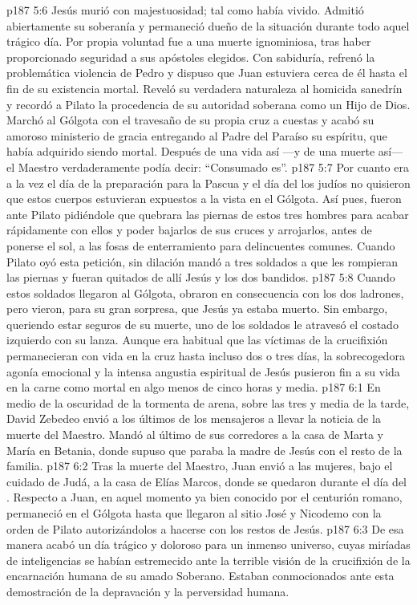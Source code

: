 \vs p187 5:6 \pc Jesús murió con majestuosidad; tal como había vivido. Admitió abiertamente su soberanía y permaneció dueño de la situación durante todo aquel trágico día. Por propia voluntad fue a una muerte ignominiosa, tras haber proporcionado seguridad a sus apóstoles elegidos. Con sabiduría, refrenó la problemática violencia de Pedro y dispuso que Juan estuviera cerca de él hasta el fin de su existencia mortal. Reveló su verdadera naturaleza al homicida sanedrín y recordó a Pilato la procedencia de su autoridad soberana como un Hijo de Dios. Marchó al Gólgota con el travesaño de su propia cruz a cuestas y acabó su amoroso ministerio de gracia entregando al Padre del Paraíso su espíritu, que había adquirido siendo mortal. Después de una vida así ---y de una muerte así--- el Maestro verdaderamente podía decir: “Consumado es”.
\vs p187 5:7 \pc Por cuanto era a la vez el día de la preparación para la Pascua y el día del  los judíos no quisieron que estos cuerpos estuvieran expuestos a la vista en el Gólgota. Así pues, fueron ante Pilato pidiéndole que quebrara las piernas de estos tres hombres para acabar rápidamente con ellos y poder bajarlos de sus cruces y arrojarlos, antes de ponerse el sol, a las fosas de enterramiento para delincuentes comunes. Cuando Pilato oyó esta petición, sin dilación mandó a tres soldados a que les rompieran las piernas y fueran quitados de allí Jesús y los dos bandidos.
\vs p187 5:8 Cuando estos soldados llegaron al Gólgota, obraron en consecuencia con los dos ladrones, pero vieron, para su gran sorpresa, que Jesús ya estaba muerto. Sin embargo, queriendo estar seguros de su muerte, uno de los soldados le atravesó el costado izquierdo con su lanza. Aunque era habitual que las víctimas de la crucifixión permanecieran con vida en la cruz hasta incluso dos o tres días, la sobrecogedora agonía emocional y la intensa angustia espiritual de Jesús pusieron fin a su vida en la carne como mortal en algo menos de cinco horas y media.
\vs p187 6:1 En medio de la oscuridad de la tormenta de arena, sobre las tres y media de la tarde, David Zebedeo envió a los últimos de los mensajeros a llevar la noticia de la muerte del Maestro. Mandó al último de sus corredores a la casa de Marta y María en Betania, donde supuso que paraba la madre de Jesús con el resto de la familia.
\vs p187 6:2 Tras la muerte del Maestro, Juan envió a las mujeres, bajo el cuidado de Judá, a la casa de Elías Marcos, donde se quedaron durante el día del . Respecto a Juan, en aquel momento ya bien conocido por el centurión romano, permaneció en el Gólgota hasta que llegaron al sitio José y Nicodemo con la orden de Pilato autorizándolos a hacerse con los restos de Jesús.
\vs p187 6:3 De esa manera acabó un día trágico y doloroso para un inmenso universo, cuyas miríadas de inteligencias se habían estremecido ante la terrible visión de la crucifixión de la encarnación humana de su amado Soberano. Estaban conmocionados ante esta demostración de la depravación y la perversidad humana.

